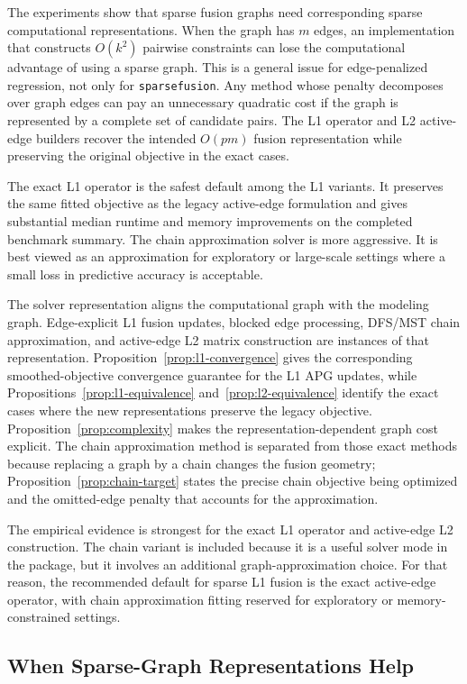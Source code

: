 \documentclass[twoside,11pt]{article}
\newcommand{\sparsefusion}{\texttt{sparsefusion}\xspace}
\begin{document}
The experiments show that sparse fusion graphs need corresponding sparse
computational representations. When the graph has $m$ edges, an implementation
that constructs $O(k^2)$ pairwise constraints can lose the computational
advantage of using a sparse graph. This is a general issue for edge-penalized
regression, not only for \sparsefusion. Any method whose penalty decomposes over
graph edges can pay an unnecessary quadratic cost if the graph is represented
by a complete set of candidate pairs. The L1 operator and L2 active-edge
builders recover the intended $O(pm)$ fusion representation while preserving
the original objective in the exact cases.

The exact L1 operator is the safest default among the L1 variants.
It preserves the same fitted objective as the legacy active-edge formulation
and gives substantial median runtime and memory improvements on the completed
benchmark summary. The chain approximation solver is more aggressive. It is best
viewed as an approximation for exploratory or large-scale settings where a
small loss in predictive accuracy is acceptable.

The solver representation aligns the computational graph with the modeling
graph. Edge-explicit L1 fusion updates, blocked edge processing, DFS/MST chain
approximation, and active-edge L2 matrix construction are instances of that
representation. Proposition~\ref{prop:l1-convergence} gives the corresponding
smoothed-objective convergence guarantee for the L1 APG updates, while
Propositions~\ref{prop:l1-equivalence} and~\ref{prop:l2-equivalence} identify
the exact cases where the new representations preserve the legacy objective.
Proposition~\ref{prop:complexity} makes the representation-dependent graph
cost explicit. The chain approximation method is separated from those exact
methods because replacing a graph by a chain changes the fusion geometry;
Proposition~\ref{prop:chain-target} states the precise chain objective being
optimized and the omitted-edge penalty that accounts for the approximation.

The empirical evidence is strongest for the exact L1 operator and active-edge
L2 construction. The chain variant is included because it is a useful solver
mode in the package, but it involves an additional graph-approximation choice.
For that reason, the recommended default for sparse L1 fusion is the exact
active-edge operator, with chain approximation fitting reserved for exploratory
or memory-constrained settings.

\subsection{When Sparse-Graph Representations Help}
\end{document}
